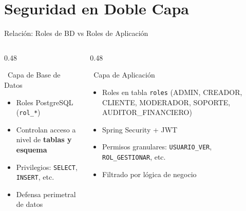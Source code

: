 \documentclass[aspectratio=169]{beamer}
\begin{document}
\section{Seguridad en Doble Capa}

\begin{frame}{Relación: Roles de BD vs Roles de Aplicación}
    \begin{columns}[T]
        \begin{column}{0.48\textwidth}
            \begin{block}{\faDatabase\ Capa de Base de Datos}
                \scriptsize
                \begin{itemize}
                    \item Roles PostgreSQL (\texttt{rol\_*})
                    \item Controlan acceso a nivel de \textbf{tablas y esquema}
                    \item Privilegios: \texttt{SELECT}, \texttt{INSERT}, etc.
                    \item Defensa perimetral de datos
                \end{itemize}
            \end{block}
        \end{column}
        \begin{column}{0.48\textwidth}
            \begin{block}{\faCode\ Capa de Aplicación}
                \scriptsize
                \begin{itemize}
                    \item Roles en tabla \texttt{roles} (ADMIN, CREADOR, CLIENTE, MODERADOR, SOPORTE, AUDITOR\_FINANCIERO)
                    \item Spring Security + JWT
                    \item Permisos granulares: \texttt{USUARIO\_VER}, \texttt{ROL\_GESTIONAR}, etc.
                    \item Filtrado por lógica de negocio
                \end{itemize}
            \end{block}
        \end{column}
    \end{columns}


\end{frame}
\end{document}
